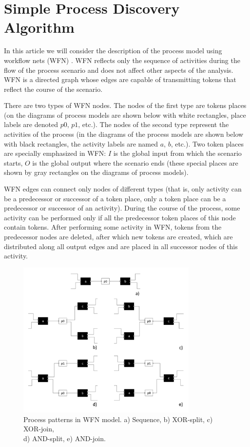 \documentclass[
11pt,%
tightenlines,%
twoside,%
onecolumn,%
nofloats,%
nobibnotes,%
nofootinbib,%
superscriptaddress,%
noshowpacs,%
centertags]%
{revtex4}
\begin{document}
\section{Simple Process Discovery Algorithm}

In this article we will consider the description of the process model using workflow nets (WFN) \cite{WorkflowNets}.
WFN reflects only the sequence of activities during the flow of the process scenario and does not affect other aspects of the analysis.
WFN is a directed graph whose edges are capable of transmitting tokens that reflect the course of the scenario.

There are two types of WFN nodes.
The nodes of the first type are tokens places (on the diagrams of process models are shown below with white rectangles, place labels are denoted $p0$, $p1$, etc.).
The nodes of the second type represent the activities of the process (in the diagrams of the process models are shown below with black rectangles, the activity labels are named $a$, $b$, etc.).
Two token places are specially emphasized in WFN: $I$ is the global input from which the scenario starts, $O$ is the global output where the scenario ends (these special places are shown by gray rectangles on the diagrams of process models).

WFN edges can connect only nodes of different types (that is, only activity can be a predecessor or successor of a token place, only a token place can be a predecessor or successor of an activity).
During the course of the process, some activity can be performed only if all the predecessor token places of this node contain tokens.
After performing some activity in WFN, tokens from the predecessor nodes are deleted, after which new tokens are created, which are distributed along all output edges and are placed in all successor nodes of this activity.

\begin{figure}[h]
\onelinecaptionsfalse %
\includegraphics[width=0.8\textwidth]{pics/wfn-patterns.pdf}
\caption{Process patterns in WFN model. a) Sequence, b) XOR-split, c) XOR-join, \\ d) AND-split, e) AND-join.}
\label{fig:wfn-patterns}
\end{figure}
\end{document}
